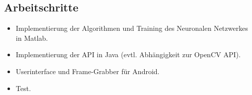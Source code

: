 \subsection*{Arbeitschritte}
	\begin{itemize}
		\item Implementierung der Algorithmen und Training des Neuronalen Netzwerkes in Matlab.
		\item Implementierung der API in Java (evtl. Abhängigkeit zur OpenCV API).
		\item Userinterface und Frame-Grabber für Android.
		\item Test.
	\end{itemize}

